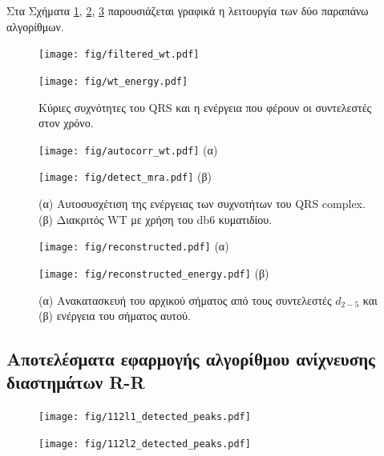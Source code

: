 \documentclass[11pt,a4paper]{article}
\renewcommand{\figurename}{Σχήμα}
\begin{document}
Στα \figurename{τα \ref{fig:algorithm1}, \ref{fig:algorithm2}, \ref{fig:algorithm3}} παρουσιάζεται γραφικά η λειτουργία των δύο παραπάνω αλγορίθμων.

\begin{figure}[H]
\centering
\begin{minipage}{0.48\textwidth}
	\centering
	\texttt{[image: fig/filtered\_wt.pdf]}
\end{minipage}
\begin{minipage}{0.48\textwidth}
	\centering
	\texttt{[image: fig/wt\_energy.pdf]}
\end{minipage}
\vfill
\caption{Κύριες συχνότητες του QRS και η ενέργεια που φέρουν οι συντελεστές στον χρόνο.}
\label{fig:algorithm1}
\end{figure}
\begin{figure}[H]
\centering
\begin{minipage}{0.48\textwidth}
	\centering
	\texttt{[image: fig/autocorr\_wt.pdf]}
	(α)
\end{minipage}
\begin{minipage}{0.48\textwidth}
	\centering
	\texttt{[image: fig/detect\_mra.pdf]}
	(β)
\end{minipage}
\vfill
\caption{(α) Αυτοσυσχέτιση της ενέργειας των συχνοτήτων του QRS complex. (β) Διακριτός WT με χρήση του db6 κυματιδίου.}
\label{fig:algorithm2}
\end{figure}
\begin{figure}[H]
\centering
\begin{minipage}{0.48\textwidth}
	\centering
	\texttt{[image: fig/reconstructed.pdf]}
	(α)
\end{minipage}
\begin{minipage}{0.48\textwidth}
	\centering
	\texttt{[image: fig/reconstructed\_energy.pdf]}
	(β)
\end{minipage}
\vfill
\caption{(α) Ανακατασκευή του αρχικού σήματος από τους συντελεστές $d_{2-5}$ και (β) ενέργεια του σήματος αυτού.}
\label{fig:algorithm3}
\end{figure}

\subsection*{Αποτελέσματα εφαρμογής αλγορίθμου ανίχνευσης διαστημάτων R-R}

\begin{figure}[H]
\centering
\begin{minipage}{0.48\textwidth}
	\centering
	\texttt{[image: fig/112l1\_detected\_peaks.pdf]}
\end{minipage}
\begin{minipage}{0.48\textwidth}
	\centering
	\texttt{[image: fig/112l2\_detected\_peaks.pdf]}
\end{minipage}
\end{figure}
\end{document}

